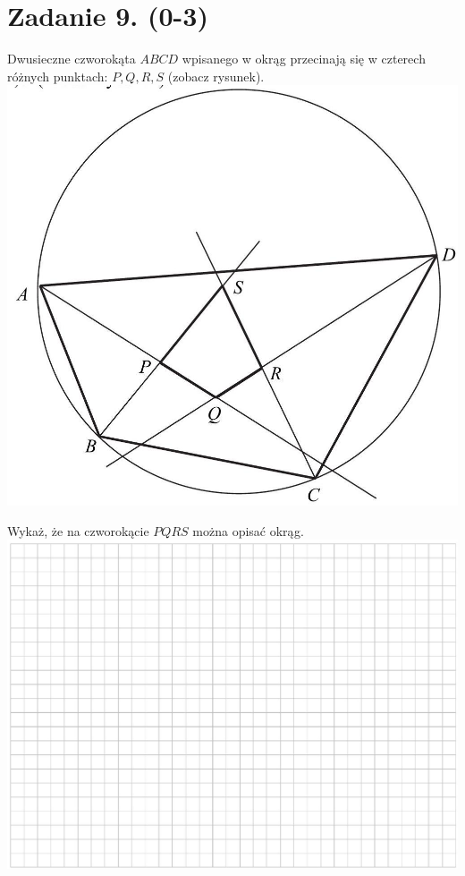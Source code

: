 \documentclass[10pt]{article}
\begin{document}
\section*{Zadanie 9. (0-3)}
Dwusieczne czworokąta \(A B C D\) wpisanego w okrąg przecinają się w czterech różnych punktach: \(P, Q, R, S\) (zobacz rysunek).\\
\includegraphics[max width=\textwidth, center]{2024_11_21_838c0cfd77f195c20440g-08}

Wykaż, że na czworokącie \(P Q R S\) można opisać okrąg.\\
\includegraphics[max width=\textwidth, center]{2024_11_21_838c0cfd77f195c20440g-08(1)}
\end{document}
